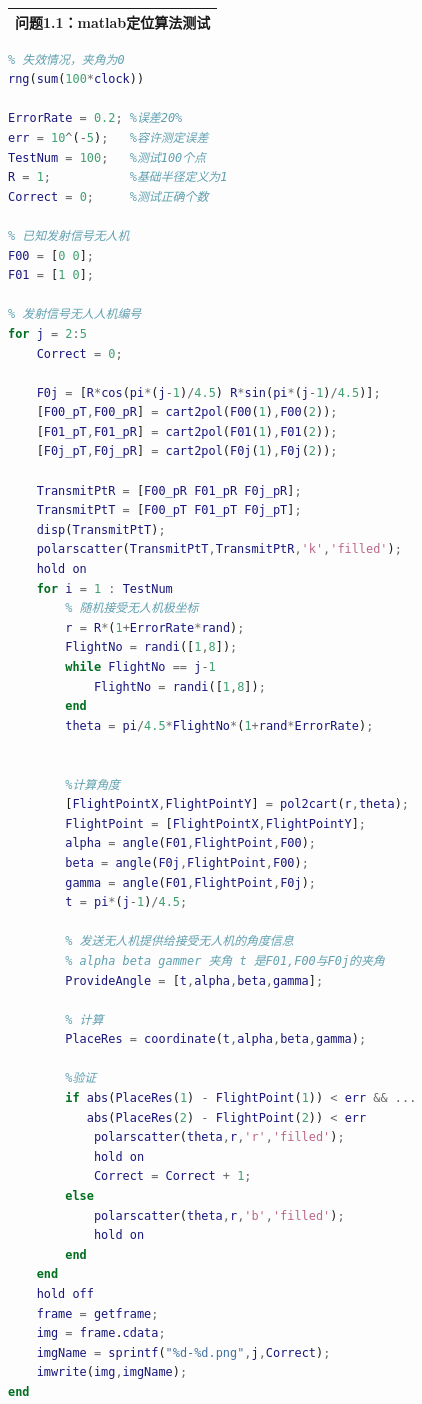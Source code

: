 \documentclass{my_paper}
\begin{document}
\begin{table}[htbp]
    \centering
    \begin{tabular}{|p{14.0cm}|}
    \hline
    \textbf{问题1.1：matlab定位算法测试} \\ %
    \hline
    \end{tabular}
\end{table}

\begin{lstlisting}[language=Matlab]
% 定位算法测试 Test of Coordinate Algorithm
% 失效情况，夹角为0
rng(sum(100*clock))

ErrorRate = 0.2; %误差20%
err = 10^(-5);   %容许测定误差
TestNum = 100;   %测试100个点
R = 1;           %基础半径定义为1
Correct = 0;     %测试正确个数

% 已知发射信号无人机
F00 = [0 0];
F01 = [1 0];

% 发射信号无人人机编号
for j = 2:5
    Correct = 0;

    F0j = [R*cos(pi*(j-1)/4.5) R*sin(pi*(j-1)/4.5)];
    [F00_pT,F00_pR] = cart2pol(F00(1),F00(2));
    [F01_pT,F01_pR] = cart2pol(F01(1),F01(2));
    [F0j_pT,F0j_pR] = cart2pol(F0j(1),F0j(2));

    TransmitPtR = [F00_pR F01_pR F0j_pR];
    TransmitPtT = [F00_pT F01_pT F0j_pT];
    disp(TransmitPtT);
    polarscatter(TransmitPtT,TransmitPtR,'k','filled');
    hold on
    for i = 1 : TestNum
        % 随机接受无人机极坐标
        r = R*(1+ErrorRate*rand);
        FlightNo = randi([1,8]);
        while FlightNo == j-1
            FlightNo = randi([1,8]);
        end
        theta = pi/4.5*FlightNo*(1+rand*ErrorRate);
        

        %计算角度
        [FlightPointX,FlightPointY] = pol2cart(r,theta);
        FlightPoint = [FlightPointX,FlightPointY];
        alpha = angle(F01,FlightPoint,F00);
        beta = angle(F0j,FlightPoint,F00);
        gamma = angle(F01,FlightPoint,F0j);
        t = pi*(j-1)/4.5;

        % 发送无人机提供给接受无人机的角度信息
        % alpha beta gammer 夹角 t 是F01,F00与F0j的夹角
        ProvideAngle = [t,alpha,beta,gamma];

        % 计算
        PlaceRes = coordinate(t,alpha,beta,gamma);
        
        %验证
        if abs(PlaceRes(1) - FlightPoint(1)) < err && ...
           abs(PlaceRes(2) - FlightPoint(2)) < err
            polarscatter(theta,r,'r','filled');
            hold on
            Correct = Correct + 1;
        else
            polarscatter(theta,r,'b','filled');
            hold on
        end
    end
    hold off
    frame = getframe;
    img = frame.cdata;
    imgName = sprintf("%d-%d.png",j,Correct);
    imwrite(img,imgName);
end
\end{lstlisting}
\end{document}
